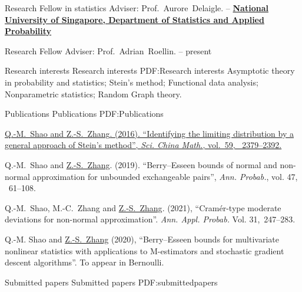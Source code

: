 \documentclass[letterpaper,MMMyyyy,nonstopmode]{simpleresumecv}
\begin{document}
\begin{Body}
\Gap
\BulletItem
Research Fellow in statistics
\SubBulletItem
Adviser:
Prof.~Aurore~Delaigle.
\hfill
{} --
\Gap 
\Entry
\href{http://www.nus.edu.sg}
{\textbf{National University of Singapore,  Department of Statistics and Applied Probability}}

\BulletItem
Research Fellow
\SubBulletItem
Adviser:
Prof.~Adrian~Roellin.
\hfill
{} --
present
\begin{Detail}

\end{Detail}



\Section
{Research interests}
{Research interests}
{PDF:Research interests}
Asymptotic theory in probability and statistics;  Stein's method;  Functional data analysis;
Nonparametric statistics; Random Graph theory.


\Section
{Publications}
{Publications}
{PDF:Publications}


\begingroup
\renewcommand{\MaxNumberedItem}{[88]}

\BigGap
\NumberedItem{[1]}
\href{http://link.springer.com/article/10.1007/s11425-016-0322-3}
{Q.-M.~Shao and \underline{Z.-S.~Zhang}.  (2016).
``Identifying the limiting distribution by a general approach of Stein’s method'',
\textit{Sci. China Math.},
vol.~59,
~2379--2392. } 

\BigGap
\NumberedItem{[2]}
{Q.-M.~Shao and \underline{Z.-S.~Zhang}. (2019).
``Berry--Esseen bounds of normal and non-normal approximation for unbounded exchangeable pairs'',
\textit{Ann. Probab.}, 
vol. 47, 
~61--108. }

\BigGap
\NumberedItem{[3]}
{Q.-M.~Shao, M.-C.~Zhang and {\underline{Z.-S.~Zhang}}. (2021),
``Cram\'er-type moderate deviations for non-normal
approximation''. \textit{Ann. Appl. Probab.}
Vol. 31,~247–283.}
 

\NumberedItem{[4]}
Q.-M. Shao and \underline{Z.-S.~Zhang} (2020),
``Berry–Esseen bounds for multivariate nonlinear statistics with applications to M-estimators and stochastic gradient descent algorithms''.
To appear in Bernoulli. 
\endgroup


\BigGap 

\Section
{Submitted papers}
{Submitted papers}
{PDF:submittedpapers}



\end{Body}
\end{document}
